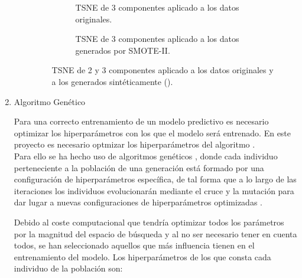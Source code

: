 \begin{enumerate}
\begin{enumerate}
\begin{figure}
\begin{subfigure}[b]{0.4\textwidth}
                        \end{subfigure}
                        \begin{subfigure}[b]{0.4\textwidth}
                            \centering
                            
                            \caption{TSNE de 3 componentes aplicado a los datos originales.}
                            \label{TSNEImages:Clean3D}
                        \end{subfigure}
                        \begin{subfigure}[b]{0.4\textwidth}
                            \centering
                            
                            \caption{TSNE de 3 componentes aplicado a los datos generados por SMOTE-II.}
                            \label{TSNEImages:Train3D}
                        \end{subfigure}
                        \caption{TSNE de 2 y 3 componentes aplicado a los datos originales y a los generados sintéticamente ().}
                        \label{TSNEImages}
                     \end{figure}

            \end{enumerate}





        \item Algoritmo Genético

            Para una correcto entrenamiento de un modelo predictivo es necesario optimizar los hiperparámetros con los que el modelo será entrenado. En este proyecto es necesario optmizar los hiperparámetros del algoritmo .\\

            Para ello se ha hecho uso de algoritmos genéticos \cite{GAXGBoostCode}, donde cada individuo perteneciente a la población de una generación está formado por una configuración de hiperparámetros específica, de tal forma que a lo largo de las iteraciones los individuos evolucionarán mediante el cruce y la mutación para dar lugar a nuevas configuraciones de hiperparámetros optimizadas \cite{GAXGBoostPaper}.

            Debido al coste computacional que tendría optimizar todos los parámetros por la magnitud del espacio de búsqueda y al no ser necesario tener en cuenta todos, se han seleccionado aquellos que más influencia tienen en el entrenamiento del modelo. Los hiperparámetros de los que consta cada individuo de la población son:


\end{enumerate}

